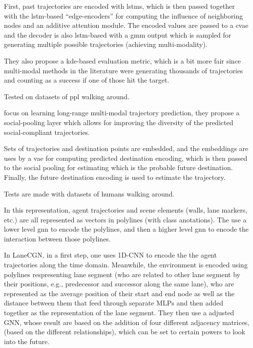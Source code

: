 First, past trajectories are encoded with \glspl{lstm}, which is then passed together with the \gls{lstm}-based ``edge-encoders'' for computing the influence of neighboring nodes and an additive attention module. 
%
The encoded values are passed to a \gls{cvae} and the decoder is also \gls{lstm}-based with a \gls{gmm} output which is sampled for generating multiple possible trajectories (achieving multi-modality).

They also propose a \gls{kde}-based evaluation metric, which is a bit more fair since multi-modal methods in the literature were generating thousands of trajectories and counting as a success if one of those hit the target.

Tested on datasets of ppl walking around.

\cite{mangalam2020not} focus on learning long-range multi-modal trajectory prediction, they propose a social-pooling layer which allows for improving the diversity of the predicted social-compliant trajectories.

Sets of trajectories and destination points are embedded, and the embeddings are uses by a \gls{vae} for computing predicted destination encoding, which is then passed to the social pooling for estimating which is the probable future destination.
%
Finally, the future destination encoding is used to estimate the trajectory.
%

Tests are made with datasets of humans walking around.


\cite{gao2020vectornet} In this representation, agent trajectories and scene elements (walls, lane markers, etc.) are all represented as vectors in polylines (with class anotations). The use a lower level gnn to encode the polylines, and then a higher level gnn to encode the interaction between those polylines. 




 
\cite{liang2020learning} In LaneCGN, in a first step, one uses 1D-CNN to encode the the agent trajectories along the time domain. Meanwhile, the environment is encoded using polylines respresenting lane segment (who are related to other lane segment by their positions, e.g., predecessor and successor along the same lane), who are represented as the average position of their start and end node as well as the distance between them that feed through separate MLPs and then added together as the representation of the lane segment. They then use a adjusted GNN, whose result are based on the addition of four different adjacency matrices, (based on the different relationships), which can be set to certain powers to look into the future.

